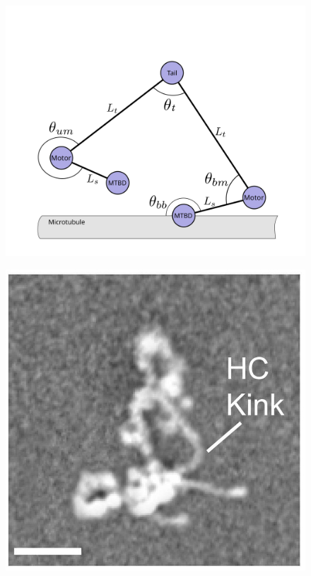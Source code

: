 \documentclass{article}
\begin{document}
\begin{figure}
 \begin{minipage}{.3\textwidth}
   \centering
   \includegraphics[width=\linewidth]{figures/schematic-1-model}
   \label{fig:explengths}
 \end{minipage}
 \begin{minipage}{.3\textwidth}
   \centering
   \includegraphics[width=\linewidth]{figures/schematic-2-cryoem}

\end{minipage}
\end{figure}
\end{document}
